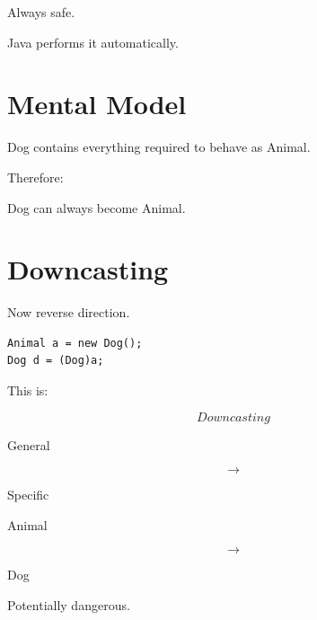 \documentclass[11pt,a4paper]{book}
\begin{document}
Always safe.


Java performs it automatically.


\section{Mental Model}

\begin{mentalmodel}

Dog contains everything required
to behave as Animal.


Therefore:

Dog can always become Animal.

\end{mentalmodel}


\section{Downcasting}

Now reverse direction.


\begin{verbatim}
Animal a = new Dog();
Dog d = (Dog)a;
\end{verbatim}


This is:

\[
Downcasting
\]


General

\[
\rightarrow
\]

Specific


Animal

\[
\rightarrow
\]

Dog


Potentially dangerous.
\end{document}
